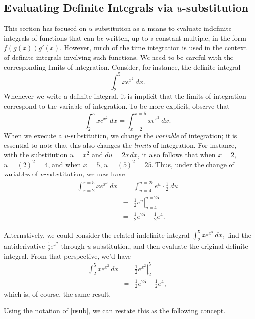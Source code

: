 
\subsection*{Evaluating Definite Integrals via $u$-substitution}

This section has focused on $u$-substitution as a means to evaluate indefinite integrals of functions that can be written, up to a constant multiple, in the form $f(g(x))g'(x)$.  However, much of the time integration is used in the context of definite integrals involving such functions. We need to be careful with the corresponding limits of integration.  Consider, for instance, the definite integral
\[ \int_2^5 xe^{x^2} \ dx. \]
Whenever we write a definite integral, it is implicit that the limits of integration correspond to the variable of integration.  To be more explicit, observe that
\[ \int_2^5 xe^{x^2} \ dx = \int_{x=2}^{x=5} xe^{x^2} \ dx. \]
When we execute a $u$-substitution, we change the \emph{variable} of integration; it is essential to note that this also changes the \emph{limits} of integration.  For instance, with the substitution $u = x^2$ and $du = 2x \, dx$, it also follows that when $x = 2$, $u = (2)^2 = 4$, and when $x = 5$, $u = (5)^2 = 25.$  Thus, under the change of variables of $u$-substitution, we now have
\begin{eqnarray*}
\int_{x=2}^{x=5} xe^{x^2} \ dx & = & \int_{u=4}^{u=25} e^{u} \cdot \frac{1}{2} \ du \\
& = & \left. \frac{1}{2}e^u \right|_{u=4}^{u=25} \\
& = & \frac{1}{2}e^{25} - \frac{1}{2}e^4.
\end{eqnarray*}

Alternatively, we could consider the related indefinite integral $\int_2^5 xe^{x^2} \, dx,$ find the antiderivative $\frac{1}{2}e^{x^2}$ through $u$-substitution, and then evaluate the original definite integral.  From that perspective, we'd have
\begin{eqnarray*}
\int_{2}^{5} xe^{x^2} \, dx & = & \left. \frac{1}{2}e^{x^2} \right|_{2}^{5} \\
& = & \frac{1}{2}e^{25} - \frac{1}{2}e^4,
\end{eqnarray*}
which is, of course, the same result.

Using the notation of \ref{usub}, we can restate this as the following concept.

